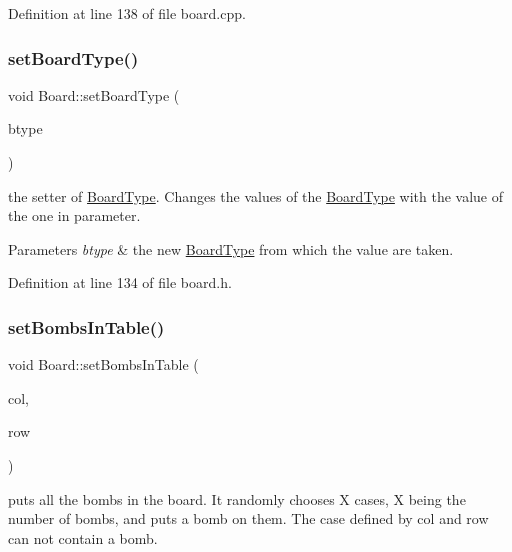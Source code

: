 Definition at line 138 of file board.\+cpp.

\mbox{\label{class_board_a5667cea4135532fa7666bf7f5cf6e71b}} 
\subsubsection{\texorpdfstring{set\+Board\+Type()}{setBoardType()}}
{\footnotesize\ttfamily void Board\+::set\+Board\+Type (\begin{DoxyParamCaption}\item[{\hyperlink{struct_board_type}{Board\+Type}}]{btype }\end{DoxyParamCaption})\hspace{0.3cm}{\ttfamily [inline]}}



the setter of \hyperlink{struct_board_type}{Board\+Type}. Changes the values of the \hyperlink{struct_board_type}{Board\+Type} with the value of the one in parameter. 


\begin{DoxyParams}{Parameters}
{\em btype} & the new \hyperlink{struct_board_type}{Board\+Type} from which the value are taken. \\
\hline
\end{DoxyParams}


Definition at line 134 of file board.\+h.

\mbox{\label{class_board_a182d0e797d7482a9091989b16dbcbee9}} 
\subsubsection{\texorpdfstring{set\+Bombs\+In\+Table()}{setBombsInTable()}}
{\footnotesize\ttfamily void Board\+::set\+Bombs\+In\+Table (\begin{DoxyParamCaption}\item[{int}]{col,  }\item[{int}]{row }\end{DoxyParamCaption})}



puts all the bombs in the board. It randomly chooses X cases, X being the number of bombs, and puts a bomb on them. The case defined by col and row can not contain a bomb. 


